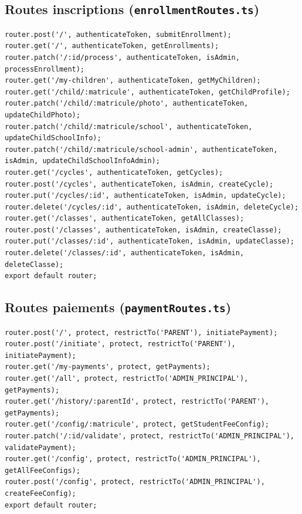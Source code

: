 \documentclass[12pt,a4paper]{article}
\begin{document}
\subsection{Routes inscriptions (\texttt{enrollmentRoutes.ts})}

\begin{lstlisting}[style=code]
router.post('/', authenticateToken, submitEnrollment);
router.get('/', authenticateToken, getEnrollments);
router.patch('/:id/process', authenticateToken, isAdmin, processEnrollment);
router.get('/my-children', authenticateToken, getMyChildren);
router.get('/child/:matricule', authenticateToken, getChildProfile);
router.patch('/child/:matricule/photo', authenticateToken, updateChildPhoto);
router.patch('/child/:matricule/school', authenticateToken, updateChildSchoolInfo);
router.patch('/child/:matricule/school-admin', authenticateToken, isAdmin, updateChildSchoolInfoAdmin);
router.get('/cycles', authenticateToken, getCycles);
router.post('/cycles', authenticateToken, isAdmin, createCycle);
router.put('/cycles/:id', authenticateToken, isAdmin, updateCycle);
router.delete('/cycles/:id', authenticateToken, isAdmin, deleteCycle);
router.get('/classes', authenticateToken, getAllClasses);
router.post('/classes', authenticateToken, isAdmin, createClasse);
router.put('/classes/:id', authenticateToken, isAdmin, updateClasse);
router.delete('/classes/:id', authenticateToken, isAdmin, deleteClasse);
export default router;
\end{lstlisting}

\subsection{Routes paiements (\texttt{paymentRoutes.ts})}

\begin{lstlisting}[style=code]
router.post('/', protect, restrictTo('PARENT'), initiatePayment);
router.post('/initiate', protect, restrictTo('PARENT'), initiatePayment);
router.get('/my-payments', protect, getPayments);
router.get('/all', protect, restrictTo('ADMIN_PRINCIPAL'), getPayments);
router.get('/history/:parentId', protect, restrictTo('PARENT'), getPayments);
router.get('/config/:matricule', protect, getStudentFeeConfig);
router.patch('/:id/validate', protect, restrictTo('ADMIN_PRINCIPAL'), validatePayment);
router.get('/config', protect, restrictTo('ADMIN_PRINCIPAL'), getAllFeeConfigs);
router.post('/config', protect, restrictTo('ADMIN_PRINCIPAL'), createFeeConfig);
export default router;
\end{lstlisting}
\end{document}
